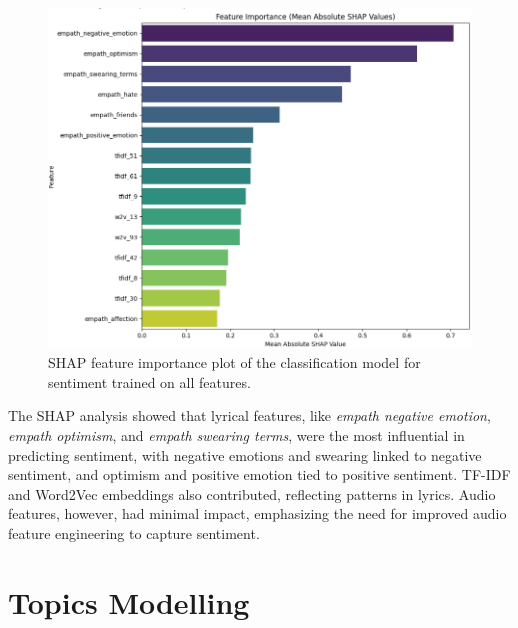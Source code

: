 \begin{center}
\begin{figure}[H]
  \centering
  \includegraphics[width=5in]{img/feature_importance_sentiment.png}
  \caption{SHAP feature importance plot of the classification model for
  sentiment trained on all features.}
  \label{Figure:fig_eh}
\end{figure}
\end{center}

The SHAP analysis showed that lyrical features, like \textit{empath negative
emotion}, \textit{empath optimism}, and \textit{empath swearing terms}, were
the most influential in predicting sentiment, with negative emotions and
swearing linked to negative sentiment, and optimism and positive emotion tied
to positive sentiment. TF-IDF and Word2Vec embeddings also contributed,
reflecting patterns in lyrics. Audio features, however, had minimal impact,
emphasizing the need for improved audio feature engineering to capture
sentiment.


\section{Topics Modelling}
\label{sec:topicsmodelling}

